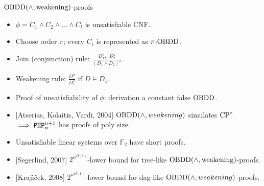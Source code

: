 \begin{frame}{$\mathrm{OBDD}(\land, \mathrm{weakening})$-proofs}
    \begin{itemize}
        \item $\phi = C_1 \land C_2\land \dots \land C_t$ is unsatisfiable CNF.
        \item Choose order $\pi$; every $C_i$ is represented as $\pi\text{-}\mathrm{OBDD}$.
        \item Join (conjunction) rule: $\frac{D_1^{\pi}, ~~ D_2^{\pi}} {(D_1\land D_2)^{\pi}}$.
        \item Weakening rule: $\frac{D^{\pi}}{D_1^{\pi}}$ if $D \models D_1$.
        \item Proof of unsatisfiability of $\phi$: derivation a constant false $\mathrm{OBDD}$.
        \pause
        \item{} [Atserias, Kolaitis, Vardi, 2004] $\mathrm{OBDD}(\land, weakening)$ simulates $\mathrm{CP}^*$
            \pause $\implies \mathtt{PHP}^{n + 1}_n$ has proofs of poly size.
        \pause
        \item Unsatisfiable linear systems over $\mathbb{F}_2$ have short proofs.
        \pause
        \item{} [Segerlind, 2007] $2^{n^{\Omega(1)}}$-lower bound for tree-like $\mathrm{OBDD}(\land,
            \mathrm{weakening})$-proofs.
        \item{} [Kraj{\'{\i}}{\v{c}}ek, 2008] $2^{n^{\Omega(1)}}$-lower bound for dag-like $\mathrm{OBDD}(\land,
            weakening)$-proofs.
    \end{itemize}
\end{frame}

